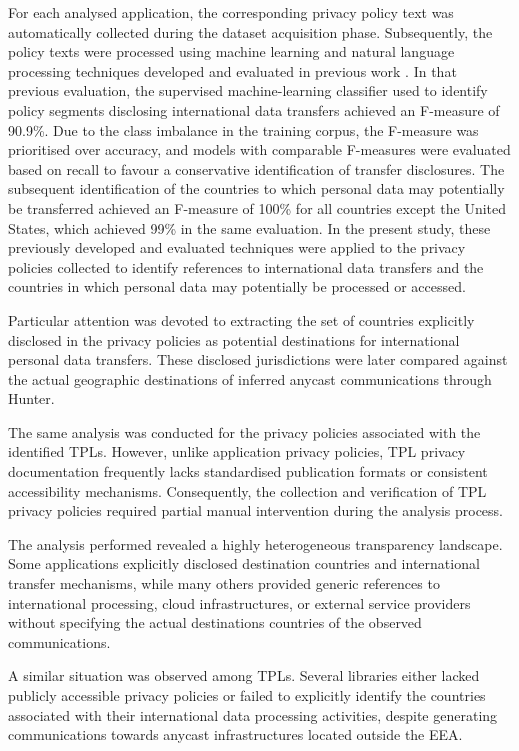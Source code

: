 For each analysed application, the corresponding privacy policy text was automatically collected during the dataset acquisition phase. Subsequently, the policy texts were processed using machine learning and natural language processing techniques developed and evaluated in previous work \cite{Guaman2023AutomatedApplications}. In that previous evaluation, the supervised machine-learning classifier used to identify policy segments disclosing international data transfers achieved an F-measure of 90.9\%. Due to the class imbalance in the training corpus, the F-measure was prioritised over accuracy, and models with comparable F-measures were evaluated based on recall to favour a conservative identification of transfer disclosures. The subsequent identification of the countries to which personal data may potentially be transferred achieved an F-measure of 100\% for all countries except the United States, which achieved 99\% in the same evaluation. In the present study, these previously developed and evaluated techniques were applied to the privacy policies collected to identify references to international data transfers and the countries in which personal data may potentially be processed or accessed.

Particular attention was devoted to extracting the set of countries explicitly disclosed in the privacy policies as potential destinations for international personal data transfers. These disclosed jurisdictions were later compared against the actual geographic destinations of inferred anycast communications through Hunter.

The same analysis was conducted for the privacy policies associated with the identified TPLs. However, unlike application privacy policies, TPL privacy documentation frequently lacks standardised publication formats or consistent accessibility mechanisms. Consequently, the collection and verification of TPL privacy policies required partial manual intervention during the analysis process.

The analysis performed revealed a highly heterogeneous transparency landscape. Some applications explicitly disclosed destination countries and international transfer mechanisms, while many others provided generic references to international processing, cloud infrastructures, or external service providers without specifying the actual destinations countries of the observed communications.

A similar situation was observed among TPLs. Several libraries either lacked publicly accessible privacy policies or failed to explicitly identify the countries associated with their international data processing activities, despite generating communications towards anycast infrastructures located outside the EEA.

